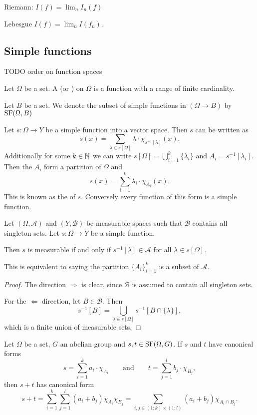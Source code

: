 Riemann: $I(f) = \lim_n I_n(f)$

Lebesgue $I(f) = \lim_n I(f_n)$.


\subsection{Simple functions}
TODO order on function spaces

\begin{definition}
Let $\Omega$ be a set. A  (or ) on $\Omega$ is a function with a range of finite cardinality.

Let $B$ be a set. We denote the subset of simple functions in $(\Omega\to B)$ by $\operatorname{SF}(\Omega,B)$
\end{definition}

\begin{lemma}
Let $s:\Omega\to Y$ be a simple function into a vector space. Then $s$ can be written as
\[ s(x) = \sum_{\lambda \in s[\Omega]}\lambda\cdot \chi_{s^{-1}[\lambda]}(x). \]
Additionally for some $k\in\mathbb{N}$ we can write $s[\Omega] = \bigcup_{i=1}^k\{\lambda_i\}$ and $A_i = s^{-1}[\lambda_i]$. Then the $A_i$ form a partition of $\Omega$ and
\[ s(x) = \sum_{i=1}^k\lambda_i\cdot \chi_{A_i}(x). \]
This is known as the  of $s$. Conversely every function of this form is a simple function.
\end{lemma}

\begin{lemma}
Let $(\Omega, \mathcal{A})$ and $(Y, \mathcal{B})$ be measurable spaces such that $\mathcal{B}$ contains all singleton sets. Let $s:\Omega\to Y$ be a simple function.

Then $s$ is measurable \textup{if and only if} $s^{-1}[\lambda]\in\mathcal{A}$ for all $\lambda\in s[\Omega]$.

This is equivalent to saying the partition $\{A_i\}_{i=1}^k$ is a subset of $\mathcal{A}$.
\end{lemma}
\begin{proof}
The direction $\boxed{\Rightarrow}$ is clear, since $\mathcal{B}$ is assumed to contain all singleton sets.

For the $\boxed{\Leftarrow}$ direction, let $B\in \mathcal{B}$. Then
\[ s^{-1}[B] = \bigcup_{\lambda\in s[\Omega]}s^{-1}[B\cap \{\lambda\}], \]
which is a finite union of measurable sets.
\end{proof}

\begin{lemma}
Let $\Omega$ be a set, $G$ an abelian group and $s,t\in\operatorname{SF}(\Omega,G)$. If $s$ and $t$ have canonical forms
\[ s = \sum_{i=1}^k a_i\cdot\chi_{A_i} \qquad\text{and}\qquad t = \sum_{j=1}^l b_j\cdot\chi_{B_j}, \]
then $s+t$ has canonical form
\[ s+t = \sum_{i=1}^k\sum_{j=1}^l (a_i+b_j)\chi_{A_i}\chi_{B_j} = \sum_{i,j \in (1:k)\times(1:l)}(a_i+b_j)\chi_{A_i\cap B_j}. \]
\end{lemma}

